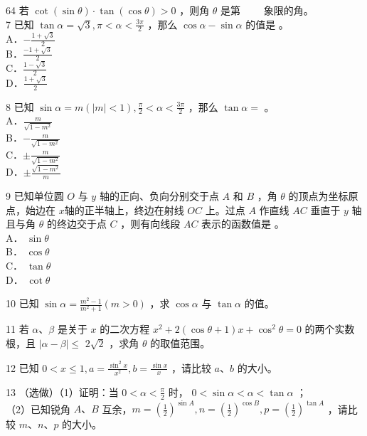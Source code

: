 \documentclass[10pt]{article}
\begin{document}
64 若 \(\cot (\sin \theta) \cdot \tan (\cos \theta)>0\) ，则角 \(\theta\) 是第 \(\qquad\)象限的角。\\
7 已知 \(\tan \alpha=\sqrt{3}, \pi<\alpha<\frac{3 \pi}{2}\) ，那么 \(\cos \alpha-\sin \alpha\) 的值是 。\\
A．\(-\frac{1+\sqrt{3}}{2}\)\\
B．\(\frac{-1+\sqrt{3}}{2}\)\\
C．\(\frac{1-\sqrt{3}}{2}\)\\
D．\(\frac{1+\sqrt{3}}{2}\)

8 已知 \(\sin \alpha=m(|m|<1), \frac{\pi}{2}<\alpha<\frac{3 \pi}{2}\) ，那么 \(\tan \alpha=\) 。\\
A．\(\frac{m}{\sqrt{1-m^{2}}}\)\\
B．\(-\frac{m}{\sqrt{1-m^{2}}}\)\\
C．\(\pm \frac{m}{\sqrt{1-m^{2}}}\)\\
D．\(\pm \frac{\sqrt{1-m^{2}}}{m}\)

9 已知单位圆 \(O\) 与 \(y\) 轴的正向、负向分别交于点 \(A\) 和 \(B\) ，角 \(\theta\) 的顶点为坐标原点，始边在 \(x\)轴的正半轴上，终边在射线 \(O C\) 上。过点 \(A\) 作直线 \(A C\) 垂直于 \(y\) 轴且与角 \(\theta\) 的终边交于点 \(C\) ，则有向线段 \(A C\) 表示的函数值是 。\\
A． \(\sin \theta\)\\
B． \(\cos \theta\)\\
C． \(\tan \theta\)\\
D． \(\cot \theta\)

10 已知 \(\sin \alpha=\frac{m^{2}-1}{m^{2}+1}(m>0)\) ，求 \(\cos \alpha\) 与 \(\tan \alpha\) 的值。

11 若 \(\alpha 、 \beta\) 是关于 \(x\) 的二次方程 \(x^{2}+2(\cos \theta+1) x+\cos ^{2} \theta=0\) 的两个实数根，且 \(|\alpha-\beta| \leqslant\) \(2 \sqrt{2}\) ，求角 \(\theta\) 的取值范围。

12 已知 \(0<x \leqslant 1, a=\frac{\sin ^{2} x}{x^{2}}, b=\frac{\sin x}{x}\) ，请比较 \(a 、 b\) 的大小。

13 （选做）（1）证明：当 \(0<\alpha<\frac{\pi}{2}\) 时， \(0<\sin \alpha<\alpha<\tan \alpha\) ；\\
（2）已知锐角 \(A 、 B\) 互余，\(m=\left(\frac{1}{2}\right)^{\sin A}, n=\left(\frac{1}{2}\right)^{\cos B}, p=\left(\frac{1}{2}\right)^{\tan A}\) ，请比较 \(m 、 n 、 p\) 的大小。
\end{document}
